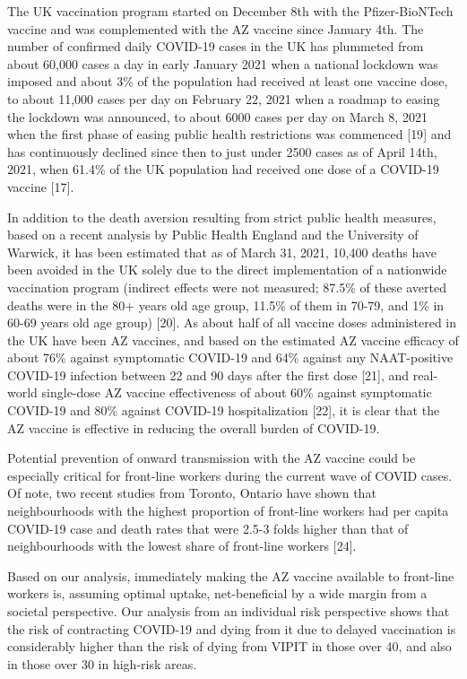 \documentclass[]{elsarticle} %
\begin{document}
The UK vaccination program started on December 8th with the
Pfizer-BioNTech vaccine and was complemented with the AZ vaccine since
January 4th. The number of confirmed daily COVID-19 cases in the UK has
plummeted from about 60,000 cases a day in early January 2021 when a
national lockdown was imposed and about 3\% of the population had
received at least one vaccine dose, to about 11,000 cases per day on
February 22, 2021 when a roadmap to easing the lockdown was announced,
to about 6000 cases per day on March 8, 2021 when the first phase of
easing public health restrictions was commenced {[}19{]} and has
continuously declined since then to just under 2500 cases as of April
14th, 2021, when 61.4\% of the UK population had received one dose of a
COVID-19 vaccine {[}17{]}.

In addition to the death aversion resulting from strict public health
measures, based on a recent analysis by Public Health England and the
University of Warwick, it has been estimated that as of March 31, 2021,
10,400 deaths have been avoided in the UK solely due to the direct
implementation of a nationwide vaccination program (indirect effects
were not measured; 87.5\% of these averted deaths were in the 80+ years
old age group, 11.5\% of them in 70-79, and 1\% in 60-69 years old age
group) {[}20{]}. As about half of all vaccine doses administered in the
UK have been AZ vaccines, and based on the estimated AZ vaccine efficacy
of about 76\% against symptomatic COVID-19 and 64\% against any
NAAT-positive COVID-19 infection between 22 and 90 days after the first
dose {[}21{]}, and real-world single-dose AZ vaccine effectiveness of
about 60\% against symptomatic COVID-19 and 80\% against COVID-19
hospitalization {[}22{]}, it is clear that the AZ vaccine is effective
in reducing the overall burden of COVID-19.

Potential prevention of onward transmission with the AZ vaccine could be
especially critical for front-line workers during the current wave of
COVID cases. Of note, two recent studies from Toronto, Ontario have
shown that neighbourhoods with the highest proportion of front-line
workers had per capita COVID-19 case and death rates that were 2.5-3
folds higher than that of neighbourhoods with the lowest share of
front-line workers {[}24{]}.

Based on our analysis, immediately making the AZ vaccine available to
front-line workers is, assuming optimal uptake, net-beneficial by a wide
margin from a societal perspective. Our analysis from an individual risk
perspective shows that the risk of contracting COVID-19 and dying from
it due to delayed vaccination is considerably higher than the risk of
dying from VIPIT in those over 40, and also in those over 30 in
high-risk areas.
\end{document}
